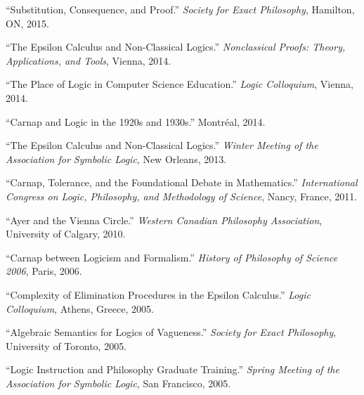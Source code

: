 \documentclass[11pt]{article}
\def\printdate#1{\xprintdate#1-}
\def\xprintdate#1-#2-#3-{#1}
\begin{document}
\ind ``Substitution, Consequence, and Proof.'' \emph{Society for Exact Philosophy}, Hamilton, ON, \printdate{2015-05-23}.







\ind ``The Epsilon Calculus and Non-Classical Logics.'' \emph{Nonclassical Proofs: Theory, Applications, and Tools}, Vienna, \printdate{2014-07-20}.


\ind ``The Place of Logic in Computer Science Education.'' \emph{Logic Colloquium}, Vienna, \printdate{2014-07-15}.


\ind ``Carnap and Logic in the 1920s and 1930s.'' Montréal, \printdate{2014-05-24}.





\ind ``The Epsilon Calculus and Non-Classical Logics.'' \emph{Winter Meeting of the Association for Symbolic Logic}, New Orleans, \printdate{2013-02-21}.



\ind ``Carnap, Tolerance, and the Foundational Debate in Mathematics.'' \emph{International Congress on Logic, Philosophy, and Methodology of Science}, Nancy, France, \printdate{2011-07-22}.





\ind ``Ayer and the Vienna Circle.'' \emph{Western Canadian Philosophy Association}, University of Calgary, \printdate{2010-10-29}.



















\ind ``Carnap between Logicism and Formalism.'' \emph{History of Philosophy of Science 2006}, Paris, \printdate{2006-06-16}.


\ind ``Complexity of Elimination Procedures in the Epsilon Calculus.'' \emph{Logic Colloquium}, Athens, Greece, \printdate{2005-08-02}.


\ind ``Algebraic Semantics for Logics of Vagueness.'' \emph{Society for Exact Philosophy}, University of Toronto, \printdate{2005-05-21}.


\ind ``Logic Instruction and Philosophy Graduate Training.'' \emph{Spring Meeting of the Association for Symbolic Logic}, San Francisco, \printdate{2005-03-26}.
\end{document}
